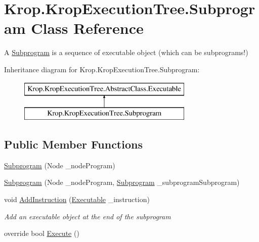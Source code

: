 \hypertarget{class_krop_1_1_krop_execution_tree_1_1_subprogram}{}\section{Krop.\+Krop\+Execution\+Tree.\+Subprogram Class Reference}
\label{class_krop_1_1_krop_execution_tree_1_1_subprogram}


A \mbox{\hyperlink{class_krop_1_1_krop_execution_tree_1_1_subprogram}{Subprogram}} is a sequence of executable object (which can be subprograms!)  


Inheritance diagram for Krop.\+Krop\+Execution\+Tree.\+Subprogram\+:\begin{figure}[H]
\begin{center}
\leavevmode
\includegraphics[height=2.000000cm]{class_krop_1_1_krop_execution_tree_1_1_subprogram}
\end{center}
\end{figure}
\subsection*{Public Member Functions}
\begin{DoxyCompactItemize}
\item 
\mbox{\hyperlink{class_krop_1_1_krop_execution_tree_1_1_subprogram_a200f90697de001a2fc317cd185db6b6b}{Subprogram}} (Node \+\_\+node\+Program)
\item 
\mbox{\hyperlink{class_krop_1_1_krop_execution_tree_1_1_subprogram_acfbfb331839d3687a7c417303ce3ea3d}{Subprogram}} (Node \+\_\+node\+Program, \mbox{\hyperlink{class_krop_1_1_krop_execution_tree_1_1_subprogram}{Subprogram}} \+\_\+subprogram\+Subprogram)
\item 
void \mbox{\hyperlink{class_krop_1_1_krop_execution_tree_1_1_subprogram_ae31602f28300c7cf092ac127b537a9df}{Add\+Instruction}} (\mbox{\hyperlink{class_krop_1_1_krop_execution_tree_1_1_abstract_class_1_1_executable}{Executable}} \+\_\+instruction)
\begin{DoxyCompactList}\small\item\em Add an executable object at the end of the subprogram \end{DoxyCompactList}\item 
override bool \mbox{\hyperlink{class_krop_1_1_krop_execution_tree_1_1_subprogram_ae33466ddf0761f860c5817a4263efd29}{Execute}} ()
\end{DoxyCompactItemize}
